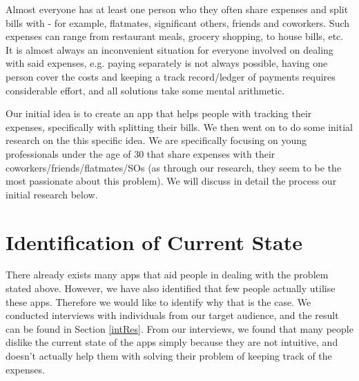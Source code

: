 \documentclass[a4wide, 10pt]{article}
\begin{document}
Almost everyone has at least one person who they often share expenses and split bills with - for example, flatmates, significant others, friends and coworkers. Such expenses can range from restaurant meals, grocery shopping, to house bills, etc. It is almost always an inconvenient situation for everyone involved on dealing with said expenses, e.g. paying separately is not always possible, having one person cover the costs and keeping a track record/ledger of payments requires considerable effort, and all solutions take some mental arithmetic.

Our initial idea is to create an app that helps people with tracking their expenses, specifically with splitting their bills. We then went on to do some initial research on the this specific idea. We are specifically focusing on young professionals under the age of 30 that share expenses with their coworkers/friends/flatmates/SOs (as through our research, they seem to be the most passionate about this problem). We will discuss in detail the process our initial research below.

\section{Identification of Current State}

There already exists many apps that aid people in dealing with the problem stated above. However, we have also identified that few people actually utilise these apps. Therefore we would like to identify why that is the case. We conducted interviews with individuals from our target audience, and the result can be found in Section \ref{intRes}. From our interviews, we found that many people dislike the current state of the apps simply because they are not intuitive, and doesn't actually help them with solving their problem of keeping track of the expenses.
\end{document}
